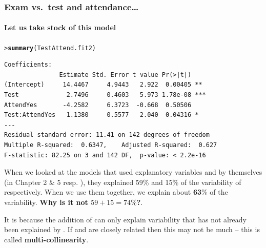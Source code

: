 \documentclass{beamer}\usepackage[]{graphicx}\usepackage[]{xcolor}
\makeatletter
\newcommand{\hlstd}[1]{\textcolor[rgb]{0.345,0.345,0.345}{#1}}%
\newcommand{\hlkwd}[1]{\textcolor[rgb]{0.737,0.353,0.396}{\textbf{#1}}}%
\newenvironment{kframe}{%
 \def\at@end@of@kframe{}%
 \ifinner\ifhmode%
  \def\at@end@of@kframe{\end{minipage}}%
  \begin{minipage}{\columnwidth}%
 \fi\fi%
 \def\FrameCommand##1{\hskip\@totalleftmargin \hskip-\fboxsep
 \colorbox{shadecolor}{##1}\hskip-\fboxsep
     \hskip-\linewidth \hskip-\@totalleftmargin \hskip\columnwidth}%
 \MakeFramed {\advance\hsize-\width
   \@totalleftmargin\z@ \linewidth\hsize
   \@setminipage}}%
 {\par\unskip\endMakeFramed%
 \at@end@of@kframe}
\newenvironment{knitrout}{}{} %
\makeatother
\begin{document}


\begin{frame}[fragile]
\frametitle{Exam vs.\ test \textbf{and} attendance\ldots}
\framesubtitle{Let us take stock of this model}

\begin{knitrout}\scriptsize
{}\color{fgcolor}\begin{kframe}
\begin{alltt}
\hlstd{> }\hlkwd{summary}\hlstd{(TestAttend.fit2)}
\end{alltt}
\end{kframe}
\end{knitrout}
\begin{knitrout}\scriptsize
{}\color{fgcolor}\begin{kframe}
\begin{verbatim}
Coefficients:
               Estimate Std. Error t value Pr(>|t|)    
(Intercept)     14.4467     4.9443   2.922  0.00405 ** 
Test             2.7496     0.4603   5.973 1.78e-08 ***
AttendYes       -4.2582     6.3723  -0.668  0.50506    
Test:AttendYes   1.1380     0.5577   2.040  0.04316 *  
---
Residual standard error: 11.41 on 142 degrees of freedom
Multiple R-squared:  0.6347,	Adjusted R-squared:  0.627 
F-statistic: 82.25 on 3 and 142 DF,  p-value: < 2.2e-16
\end{verbatim}
\end{kframe}
\end{knitrout}
When we looked at the models that used explanatory variables  and 
by themselves (in Chapter 2 \& 5 resp. ), they explained 59\% and 15\% of the variability of  respectively. 
When we use them together, we explain about \textbf{63}\% of the variability. 
\textbf{Why is it not $59+15 =74\%$?}. 

\medskip

It is because the addition of  can only explain variability that
has not already been explained by .
If  and  are closely related then this may not be much --
this is called \textbf{multi-collinearity}.

\end{frame}
\end{document}
